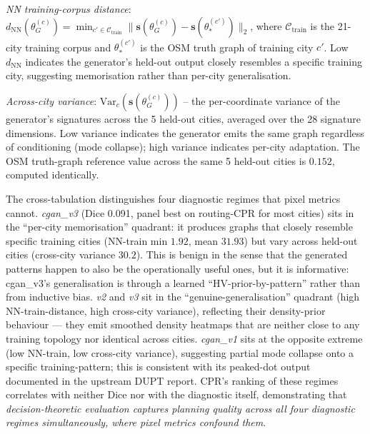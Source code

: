 \documentclass[10pt,a4paper]{article}
\begin{document}
\textit{NN training-corpus distance}:
$d_{\mathrm{NN}}(\theta_G^{(c)}) = \min_{c' \in \mathcal{C}_{\mathrm{train}}} \|\mathbf{s}(\theta_G^{(c)}) - \mathbf{s}(\theta_*^{(c')})\|_2$,
where $\mathcal{C}_{\mathrm{train}}$ is the 21-city training
corpus and $\theta_*^{(c')}$ is the OSM truth graph of training
city $c'$. Low $d_{\mathrm{NN}}$ indicates the generator's
held-out output closely resembles a specific training city,
suggesting memorisation rather than per-city generalisation.

\textit{Across-city variance}:
$\mathrm{Var}_c(\mathbf{s}(\theta_G^{(c)}))$ -- the per-coordinate
variance of the generator's signatures across the 5 held-out
cities, averaged over the 28 signature dimensions. Low variance
indicates the generator emits the same graph regardless of
conditioning (mode collapse); high variance indicates per-city
adaptation. The OSM truth-graph reference value across the same
5 held-out cities is $0.152$, computed identically.

\begin{table}[h]
\centering
\caption{\textbf{Table 3\,\textbar} Memorisation and mode-collapse
diagnostics. Lower NN-train-distance = closer to a specific
training city; lower cross-city variance = less per-city
adaptation. The truth row is the reference upper bound on
cross-city variance for honestly generalising models.
Regimes assigned by median-threshold on each axis.}
\label{tab:memorisation}

\end{table}

The cross-tabulation distinguishes four diagnostic regimes that
pixel metrics cannot. \textit{cgan\_v3} (Dice 0.091, panel best
on routing-CPR for most cities) sits in the
``per-city memorisation'' quadrant: it produces graphs that
closely resemble specific training cities (NN-train min
$1.92$, mean $31.93$) but vary across held-out cities
(cross-city variance $30.2$). This is benign in the sense that
the generated patterns happen to also be the operationally
useful ones, but it is informative: cgan\_v3's generalisation is
through a learned ``HV-prior-by-pattern'' rather than from
inductive bias. \textit{v2} and \textit{v3} sit in the
``genuine-generalisation'' quadrant (high NN-train-distance,
high cross-city variance), reflecting their density-prior
behaviour --- they emit smoothed density heatmaps that are
neither close to any training topology nor identical across
cities. \textit{cgan\_v1} sits at the opposite extreme
(low NN-train, low cross-city variance), suggesting partial
mode collapse onto a specific training-pattern; this is
consistent with its peaked-dot output documented in the upstream
DUPT report. CPR's ranking of these regimes correlates with
neither Dice nor with the diagnostic itself, demonstrating that
\emph{decision-theoretic evaluation captures planning quality
across all four diagnostic regimes simultaneously, where pixel
metrics confound them}.
\end{document}
